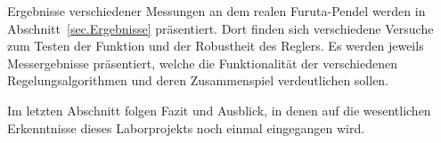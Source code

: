 Ergebnisse verschiedener Messungen an dem realen Furuta-Pendel werden in Abschnitt~\ref{sec.Ergebnisse} präsentiert. 
Dort finden sich verschiedene Versuche zum Testen der Funktion und der Robustheit des Reglers.
Es werden jeweils Messergebnisse präsentiert, welche die Funktionalität der verschiedenen Regelungsalgorithmen und deren Zusammenspiel verdeutlichen sollen.

Im letzten Abschnitt folgen Fazit und Ausblick, in denen auf die wesentlichen Erkenntnisse dieses Laborprojekts noch einmal eingegangen wird.

